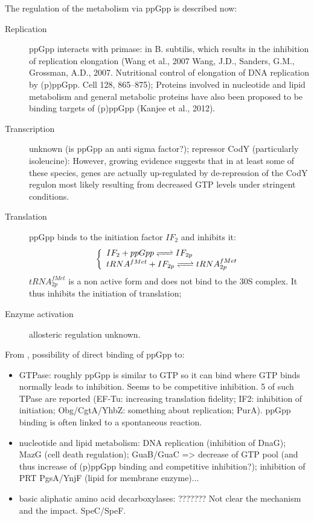 The regulation of the metabolism via ppGpp is described now:
\begin{description}
  \item[Replication] ppGpp interacts with primase: in B. subtilis, which results in the inhibition of replication elongation (Wang et al., 2007 Wang, J.D., Sanders, G.M., Grossman, A.D., 2007. Nutritional control of elongation of DNA replication by (p)ppGpp. Cell 128, 865–875); Proteins involved in nucleotide and lipid metabolism and general metabolic proteins have also been proposed to be binding targets of (p)ppGpp (Kanjee et al., 2012).
  \item[Transcription] unknown (is ppGpp an anti sigma factor?); repressor CodY (particularly isoleucine):  However, growing evidence suggests that in at least some of these species, genes are actually up-regulated by de-repression of the CodY regulon most likely resulting from decreased GTP levels under stringent conditions.
  \item[Translation] ppGpp binds to the initiation factor $IF_2$ and inhibits it:
    $$
      \left\{
        \begin{array}{l}
          \reactionRev{IF_2+ppGpp}{IF_{2p}}{}{} \\
          \reactionRev{tRNA^{fMet}+IF_{2p}}{tRNA_{2p}^{fMet}}{}{} \\
        \end{array}
      \right.
    $$
    $tRNA_{2p}^{fMet}$ is a non active form and does not bind to the 30S complex. It thus inhibits the initiation of translation;
  \item[Enzyme activation] allosteric regulation unknown.
\end{description}


\bigskip

From \cite{KaH:12}, possibility of direct binding of ppGpp to:
\begin{itemize}
  \item GTPase: roughly ppGpp is similar to GTP so it can bind where GTP binds normally leads to inhibition. Seems to be competitive inhibition. 5 of such TPase are reported (EF-Tu: increasing translation fidelity; IF2: inhibition of initiation; Obg/CgtA/YhbZ: something about replication; PurA). ppGpp binding is often linked to a spontaneous reaction.
  \item nucleotide and lipid metabolism: DNA replication (inhibition of DnaG); MazG (cell death regulation); GuaB/GuaC => decrease of GTP pool (and thus increase of (p)ppGpp binding and competitive inhibition?); inhibition of PRT PgsA/YnjF (lipid for membrane enzyme)...
  \item basic aliphatic amino acid decarboxylases: ??????? Not clear the mechanism and the impact. SpeC/SpeF.
\end{itemize}

